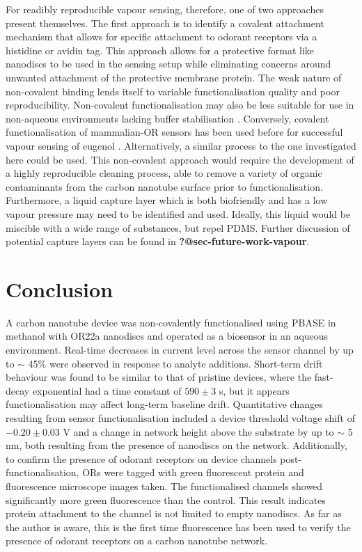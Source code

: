 \documentclass[
  a4paper,
]{scrbook}
\begin{document}
For readibly reproducible vapour sensing, therefore, one of two
approaches present themselves. The first approach is to identify a
covalent attachment mechanism that allows for specific attachment to
odorant receptors via a histidine or avidin tag. This approach allows
for a protective format like nanodiscs to be used in the sensing setup
while eliminating concerns around unwanted attachment of the protective
membrane protein. The weak nature of non-covalent binding lends itself
to variable functionalisation quality and poor reproducibility.
Non-covalent functionalisation may also be less suitable for use in
non-aqueous environments lacking buffer stabilisation \autocite{Li2023}.
Conversely, covalent functionalisation of mammalian-OR sensors has been
used before for successful vapour sensing of eugenol
\autocite{Goldsmith2011}. Alternatively, a similar process to the one
investigated here could be used. This non-covalent approach would
require the development of a highly reproducible cleaning process, able
to remove a variety of organic contaminants from the carbon nanotube
surface prior to functionalisation. Furthermore, a liquid capture layer
which is both biofriendly and has a low vapour pressure may need to be
identified and used. Ideally, this liquid would be miscible with a wide
range of substances, but repel PDMS. Further discussion of potential
capture layers can be found in \textbf{?@sec-future-work-vapour}.

\hypertarget{conclusion}{%
\section{Conclusion}\label{conclusion}}

A carbon nanotube device was non-covalently functionalised using PBASE
in methanol with OR22a nanodiscs and operated as a biosensor in an
aqueous environment. Real-time decreases in current level across the
sensor channel by up to \(\sim\) 45\% were observed in response to
analyte additions. Short-term drift behaviour was found to be similar to
that of pristine devices, where the fast-decay exponential had a time
constant of \(590\pm3\) s, but it appears functionalisation may affect
long-term baseline drift. Quantitative changes resulting from sensor
functionalisation included a device threshold voltage shift of
\(-0.20\pm0.03\) V and a change in network height above the substrate by
up to \(\sim\) 5 nm, both resulting from the presence of nanodiscs on
the network. Additionally, to confirm the presence of odorant receptors
on device channels post-functionalisation, ORs were tagged with green
fluorescent protein and fluorescence microscope images taken. The
functionalised channels showed significantly more green fluorescence
than the control. This result indicates protein attachment to the
channel is not limited to empty nanodiscs. As far as the author is
aware, this is the first time fluorescence has been used to verify the
presence of odorant receptors on a carbon nanotube network.
\end{document}
